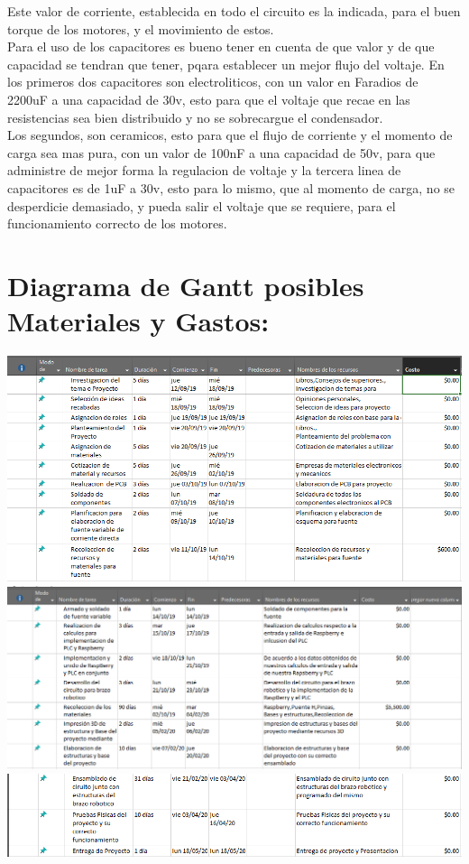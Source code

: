 \documentclass[14pt,a4paper]{article}
\begin{document}
Este valor de corriente, establecida en todo el circuito es la indicada, para el buen torque de los motores, y el movimiento de estos.\\
Para el uso de los capacitores es bueno tener en cuenta de que valor y de que capacidad se tendran que tener, pqara establecer un mejor flujo del voltaje. En los primeros dos capacitores son electroliticos, con un valor en Faradios de 2200uF a una capacidad de 30v, esto para que el voltaje que recae en las resistencias sea bien distribuido y no se sobrecargue el condensador.\\
Los segundos, son ceramicos, esto para que el flujo de corriente y el momento de carga sea mas pura, con un valor de 100nF a una capacidad de 50v, para que administre de mejor forma la regulacion de voltaje y la tercera linea de capacitores es de 1uF a 30v, esto para lo mismo, que al momento de carga, no se desperdicie demasiado, y pueda salir el voltaje que se requiere, para el funcionamiento correcto de los motores.

\section{Diagrama de Gantt posibles Materiales y Gastos:}

\begin{center}
\includegraphics[width=15cm]{DefinicionTareas/4.png} 
\includegraphics[width=15cm]{DefinicionTareas/5.png} 
\includegraphics[width=15cm]{DefinicionTareas/6.png} 
\end{center}
\end{document}
